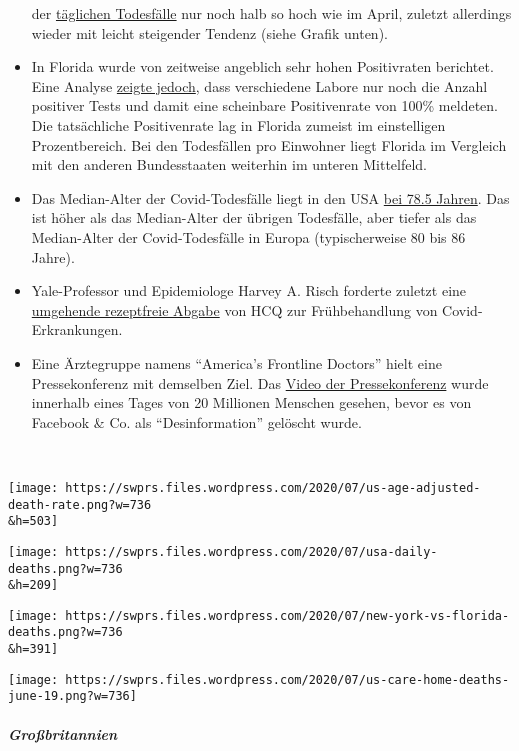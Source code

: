 \begin{itemize}
  der \href{https://covidusa.net/}{täglichen Todesfälle} nur noch halb
  so hoch wie im April, zuletzt allerdings wieder mit leicht steigender
  Tendenz (siehe Grafik unten).
\item
  In Florida wurde von zeitweise angeblich sehr hohen Positivraten
  berichtet. Eine Analyse
  \href{https://www.fox35orlando.com/news/fox-35-investigates-florida-department-of-health-says-some-labs-have-not-reported-negative-covid-19-results}{zeigte
  jedoch}, dass verschiedene Labore nur noch die Anzahl positiver Tests
  und damit eine scheinbare Positivenrate von 100\% meldeten. Die
  tatsächliche Positivenrate lag in Florida zumeist im einstelligen
  Prozentbereich. Bei den Todesfällen pro Einwohner liegt Florida im
  Vergleich mit den anderen Bundesstaaten weiterhin im unteren
  Mittelfeld.
\item
  Das Median-Alter der Covid-Todesfälle liegt in den USA
  \href{https://twitter.com/kylamb8/status/1287952340822175744}{bei 78.5
  Jahren}. Das ist höher als das Median-Alter der übrigen Todesfälle,
  aber tiefer als das Median-Alter der Covid-Todesfälle in Europa
  (typischerweise 80 bis 86 Jahre).
\item
  Yale-Professor und Epidemiologe Harvey A. Risch forderte zuletzt eine
  \href{https://www.newsweek.com/key-defeating-covid-19-already-exists-we-need-start-using-it-opinion-1519535}{umgehende
  rezeptfreie Abgabe} von HCQ zur Frühbehandlung von Covid-Erkrankungen.
\item
  Eine Ärztegruppe namens ``America's Frontline Doctors'' hielt eine
  Pressekonferenz mit demselben Ziel. Das
  \href{https://omnij.org/AmericasFrontlineDoctors}{Video der
  Pressekonferenz} wurde innerhalb eines Tages von 20 Millionen Menschen
  gesehen, bevor es von Facebook \& Co. als ``Desinformation'' gelöscht
  wurde.
\end{itemize}

~

\texttt{[image: https://swprs.files.wordpress.com/2020/07/us-age-adjusted-death-rate.png?w=736\\\&h=503]}

\texttt{[image: https://swprs.files.wordpress.com/2020/07/usa-daily-deaths.png?w=736\\\&h=209]}

\texttt{[image: https://swprs.files.wordpress.com/2020/07/new-york-vs-florida-deaths.png?w=736\\\&h=391]}

\texttt{[image: https://swprs.files.wordpress.com/2020/07/us-care-home-deaths-june-19.png?w=736]}

\hypertarget{grouxdfbritannien}{%
\subparagraph{\texorpdfstring{\textbf{Großbritannien}}{Großbritannien}}\label{grouxdfbritannien}}

